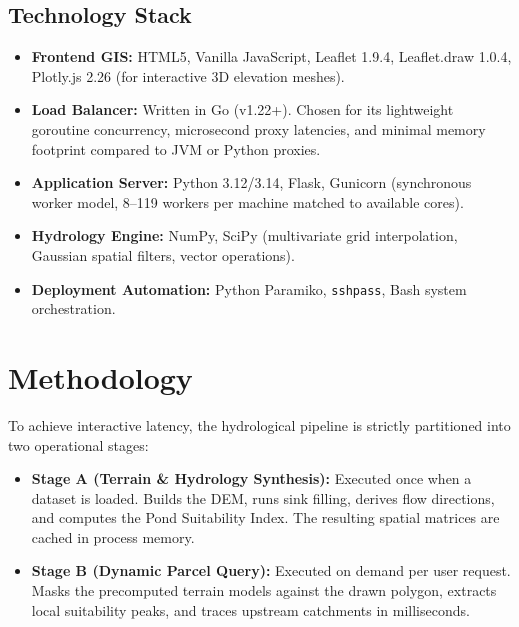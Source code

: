 \documentclass[manuscript,screen,review]{acmart}
\begin{document}
\subsection{Technology Stack}
\begin{itemize}
    \item \textbf{Frontend GIS:} HTML5, Vanilla JavaScript, Leaflet 1.9.4, Leaflet.draw 1.0.4, Plotly.js 2.26 (for interactive 3D elevation meshes).
    \item \textbf{Load Balancer:} Written in Go (v1.22+). Chosen for its lightweight goroutine concurrency, microsecond proxy latencies, and minimal memory footprint compared to JVM or Python proxies.
    \item \textbf{Application Server:} Python 3.12/3.14, Flask, Gunicorn (synchronous worker model, 8--119 workers per machine matched to available cores).
    \item \textbf{Hydrology Engine:} NumPy, SciPy (multivariate grid interpolation, Gaussian spatial filters, vector operations).
    \item \textbf{Deployment Automation:} Python Paramiko, \texttt{sshpass}, Bash system orchestration.
\end{itemize}

\section{Methodology}
\label{sec:methodology}
To achieve interactive latency, the hydrological pipeline is strictly partitioned into two operational stages:
\begin{itemize}
    \item \textbf{Stage A (Terrain \& Hydrology Synthesis):} Executed once when a dataset is loaded. Builds the DEM, runs sink filling, derives flow directions, and computes the Pond Suitability Index. The resulting spatial matrices are cached in process memory.
    \item \textbf{Stage B (Dynamic Parcel Query):} Executed on demand per user request. Masks the precomputed terrain models against the drawn polygon, extracts local suitability peaks, and traces upstream catchments in milliseconds.
\end{itemize}
\end{document}
